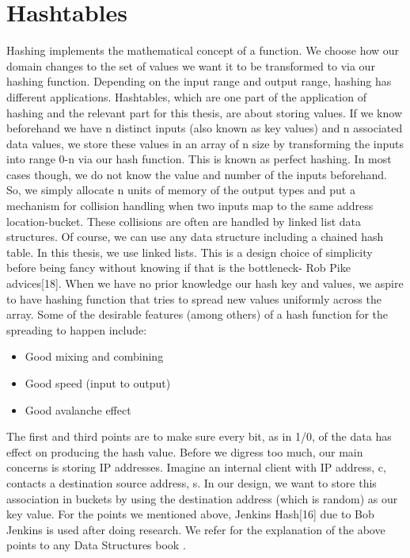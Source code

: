 \documentclass[11pt,left=2cm,bottom=2cm,oneside]{book}
\begin{document}
\section{Hashtables}
Hashing implements the mathematical concept of a function. We choose how
our domain changes to the set of values we want it to be transformed to via
our
hashing function. Depending on the input range and output range, hashing has
different applications.
Hashtables, which are one part of the application of hashing and the relevant
part for this thesis, are about storing values. If we know beforehand we have
n
distinct inputs (also known as key values) and n associated data values, we
store
these values in an array of n size by transforming the inputs into range 0-n
via our
hash function. This is known as perfect hashing. In most cases though, we do
not
know the value and number of the inputs beforehand. So, we simply allocate n
units
of memory of the output types and put a mechanism for collision handling when
two inputs map to the same address location-bucket. These collisions are often are
handled by linked list data structures. Of course, we can use any data structure
including a chained hash table. In this thesis, we use linked lists. This is a design
choice of simplicity before being fancy without knowing if that is the bottleneck-
Rob Pike advices[18]. When we have no prior knowledge our hash key and values,
we aspire to have hashing function that tries to spread new values uniformly across
the array. Some of the desirable features (among others) of a hash function for the
spreading to happen include:
\begin{itemize}
\item Good mixing and combining
\item Good speed (input to output)
\item Good avalanche effect
\end{itemize}
The first and third points are to make sure every bit, as in 1/0, of the data has
effect on producing the hash value.
Before we digress too much, our main concerns is storing IP addresses. Imagine
an internal client with IP address, c, contacts a destination source address, s. In
our design, we want to store this association in buckets by using the destination
address (which is random) as our key value. For the points we mentioned above,
Jenkins Hash[16] due to Bob Jenkins is used after doing research. We refer for the
explanation of the above points to any Data Structures book .
\end{document}
